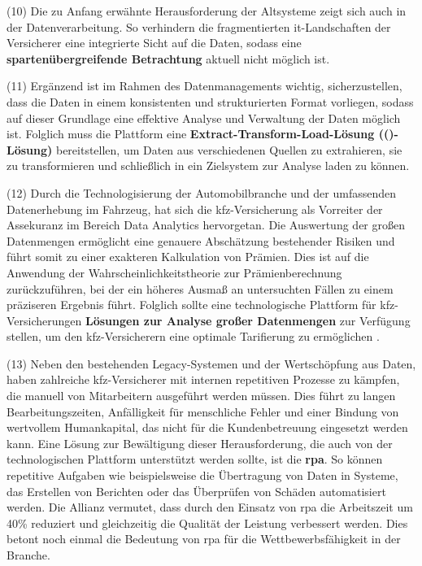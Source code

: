 (10) Die zu Anfang erwähnte Herausforderung der Altsysteme zeigt sich auch in der Datenverarbeitung. So verhindern die fragmentierten \ac{it}-Landschaften der Versicherer eine integrierte Sicht auf die Daten, sodass eine \textbf{spartenübergreifende Betrachtung} aktuell nicht möglich ist. \autocite[Vgl.][S. 11]{GUNTER2020}

(11) Ergänzend ist im Rahmen des Datenmanagements wichtig, sicherzustellen, dass die Daten in einem konsistenten und strukturierten Format vorliegen, sodass auf dieser Grundlage eine effektive Analyse und Verwaltung der Daten möglich ist. Folglich muss die Plattform eine \textbf{Extract-Transform-Load-Lösung (()-Lösung)} bereitstellen, um Daten aus verschiedenen Quellen zu extrahieren, sie zu transformieren und schließlich in ein Zielsystem zur Analyse laden zu können. \autocite[Vgl.][]{WEINGARTNER2023}

(12) Durch die Technologisierung der Automobilbranche und der umfassenden Datenerhebung im Fahrzeug, hat sich die \ac{kfz}-Versicherung als Vorreiter der Assekuranz im Bereich Data Analytics hervorgetan. \autocite[Vgl.][S. 187]{GATZERT2023} Die Auswertung der großen Datenmengen ermöglicht eine genauere Abschätzung bestehender Risiken und führt somit zu einer exakteren Kalkulation von Prämien. Dies ist auf die Anwendung der Wahrscheinlichkeitstheorie zur Prämienberechnung zurückzuführen, bei der ein höheres Ausmaß an untersuchten Fällen zu einem präziseren Ergebnis führt. Folglich sollte eine technologische Plattform für \ac{kfz}-Versicherungen \textbf{Lösungen zur Analyse großer Datenmengen} zur Verfügung stellen, um den \ac{kfz}-Versicherern eine optimale Tarifierung zu ermöglichen \autocite[Vgl.][S. 146]{MANGEI2019}. 

(13) Neben den bestehenden Legacy-Systemen und der Wertschöpfung aus Daten, haben zahlreiche \ac{kfz}-Versicherer mit internen repetitiven Prozesse zu kämpfen, die manuell von Mitarbeitern ausgeführt werden müssen. Dies führt zu langen Bearbeitungszeiten, Anfälligkeit für menschliche Fehler und einer Bindung von wertvollem Humankapital, das nicht für die Kundenbetreuung eingesetzt werden kann. Eine Lösung zur Bewältigung dieser Herausforderung, die auch von der technologischen Plattform unterstützt werden sollte, ist die \textbf{\ac{rpa}}. So können repetitive Aufgaben wie beispielsweise die Übertragung von Daten in Systeme, das Erstellen von Berichten oder das Überprüfen von Schäden automatisiert werden. \autocite[Vgl.][S. 296-298]{REICH2019} Die Allianz vermutet, dass durch den Einsatz von \ac{rpa} die Arbeitszeit um 40\% reduziert und gleichzeitig die Qualität der Leistung verbessert werden. Dies betont noch einmal die Bedeutung von \ac{rpa} für die Wettbewerbsfähigkeit in der Branche. \autocite[Vgl.][S. 296-298]{REICH2019}

